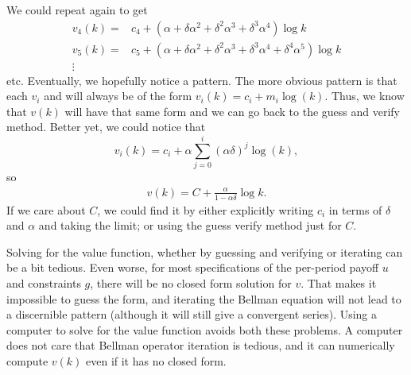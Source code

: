 \begin{example}
  We could repeat again to get 
  \begin{align*}
    v_4(k) = & c_4 + (\alpha + \delta \alpha^2 + \delta^2 \alpha^3 +
    \delta^3 \alpha^4) \log k \\
    v_5(k) = & c_5 + (\alpha + \delta \alpha^2 + \delta^2 \alpha^3 +
    \delta^3 \alpha^4 + \delta^4 \alpha^5) \log k \\
    \vdots
  \end{align*}
  etc. Eventually, we hopefully notice a pattern. The more obvious
  pattern is that each $v_i$ and will always be of the form $v_i(k) =
  c_i + m_i \log(k)$. Thus, we know that $v(k)$ will have that same
  form and we can go back to the guess and verify method. Better yet,
  we could notice that
  \[ v_i(k) = c_i + \alpha \sum_{j = 0}^i (\alpha \delta)^j \log(k),\]
  so 
  \begin{align*}
    v(k) = C + \frac{\alpha}{1-\alpha \delta} \log k.
  \end{align*}
  If we care about $C$, we could find it by either explicitly writing
  $c_i$ in terms of $\delta$ and $\alpha$ and taking the limit; or
  using the guess verify method just for $C$. 
\end{example}

Solving for the value function, whether by guessing and verifying or
iterating can be a bit tedious. Even worse, for most specifications of
the per-period payoff $u$ and constraints $g$, there will be no closed
form solution for $v$. That makes it impossible to guess the form, and
iterating the Bellman equation will not lead to a discernible pattern
(although it will still give a convergent series). Using a computer to
solve for the value function avoids both these problems. A computer
does not care that Bellman operator iteration is tedious, and it can
numerically compute $v(k)$ even if it has no closed form. 

